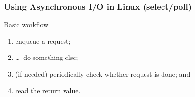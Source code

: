 \begin{frame}
  \frametitle{Using Asynchronous I/O in Linux (select/poll)}


   Basic workflow: \\[1em]
   \begin{enumerate}
     \item enqueue a request;
     \item \ldots ~do something else;
     \item (if needed) periodically check whether request is done; and
     \item read the return value.
   \end{enumerate}

  
\end{frame}




